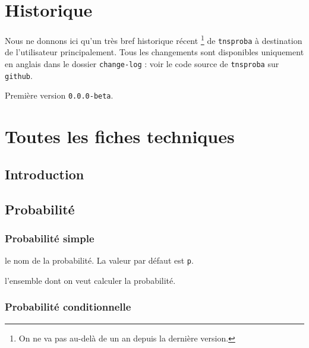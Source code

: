 \documentclass[12pt,a4paper]{article}
\theoremstyle{definition}
\begin{document}
\section{Historique}

Nous ne donnons ici qu'un très bref historique récent
\footnote{
	On ne va pas au-delà de un an depuis la dernière version.
}
de \verb+tnsproba+ à destination de l'utilisateur principalement.
Tous les changements sont disponibles uniquement en anglais dans le dossier \verb+change-log+ : voir le code source de \verb+tnsproba+ sur \verb+github+.

\begin{description}

    \medskip
    \item[2020-07-10] Première version \verb+0.0.0-beta+.

\end{description}


\newpage
\section{Toutes les fiches techniques} \label{techincal-ids}

\subsection{Introduction}
\subsection{Probabilité}

\subsubsection{Probabilité \og simple \fg}


\IDoption{} le nom de la probabilité. La valeur par défaut est \verb+p+.

\IDarg{} l'ensemble dont on veut calculer la probabilité.





\subsubsection{Probabilité conditionnelle}

\end{document}
